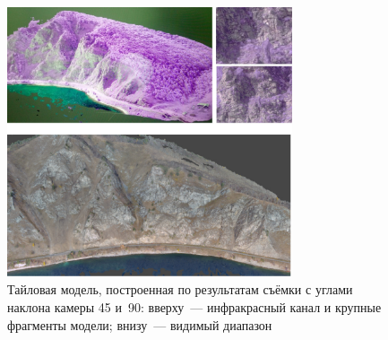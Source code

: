 \begin{figure}[H]
  \begin{center}
    \includegraphics[width=0.75\textwidth]{authors/efremov-fig3.jpg}
  \end{center}
  \caption{Тайловая модель, построенная по результатам съёмки с углами наклона камеры 45 и~90\dg: вверху~--- инфракрасный канал и крупные фрагменты модели; внизу~--- видимый диапазон}
  \label{fig:efremov-fig3}
\end{figure}
